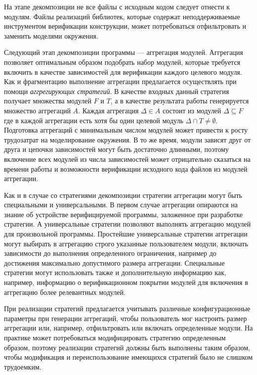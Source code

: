\documentclass[%
candidate,     %
href,        %
colorlinks,  %
]{disser}
\begin{document}
На этапе декомпозиции не все файлы с исходным кодом следует отнести к модулям.
Файлы реализаций библиотек, которые содержат неподдерживаемые инструментом верификации конструкции, может потребоваться отфильтровать и заменить моделями окружения.

Следующий этап декомпозиции программы --- аггрегация модулей.
Аггрегация позволяет оптимальным образом подобрать набор модулей, которые требуется включить в качестве зависимостей для верификации каждого целевого модуля.
Как и фрагментацию выполнение аггрегации предлагается осуществлять при помощи \textit{аггрегирующих стратегий}.
В качестве входных данный стратегия получает множества модулей $F$ и $T$, а в качестве результата работы генерируется множество аггрегаций $A$.
Каждая аггрегация $\Delta \in A$ состоит из модулей $\Delta \subseteq F$ где в каждой аггрегации есть хотя бы один целевой модуль $\Delta \cap T \neq \emptyset$.
Подготовка аггрегаций с минимальным числом модулей может привести к росту трудозатрат на моделирование окружения.
В то же время, модули зависят друг от друга и цепочки зависимостей могут быть достаточно длинными, поэтому включение всех модулей из числа зависимостей может отрицательно сказаться на времени работы и возможности верификации исходного кода файлов из модулей аггрегации.

Как и в случае со стратегиями декомпозиции стратегии аггрегации могут быть специальными и универсальными.
В первом случае аггрегации опираются на знание об устройстве верифицируемой программы, заложенное при разработке стратегии.
А универсальные стратегии позволяют выполнять аггрегацию модулей для произвольной программы.
Простейшие универсальные стратегии аггрегации могут выбирать в аггрегацию строго указанные пользователем модули, включать зависимости до выполнения определенного ограничения, например до достижения максимально допустимого размера аггрегации.
Специальные стратегии могут использовать также и дополнительную информацию как, например, информацию о верификационном покрытии модулей для включения в аггрегацию более релевантных модулей.

При реализации стратегий предлагается учитывать различные конфигурационные параметры при генерации аггрегаций, чтобы пользователь мог настроить размер аггрегации или, например, отфильтровать или включать определенные модули.
На практике может потребоваться модифицировать стратегию определенным образом, поэтому реализации стратегий должны быть выполнены таким образом, чтобы модификация и переиспользование имеющихся стратегий было не слишком трудоемким.
\end{document}
